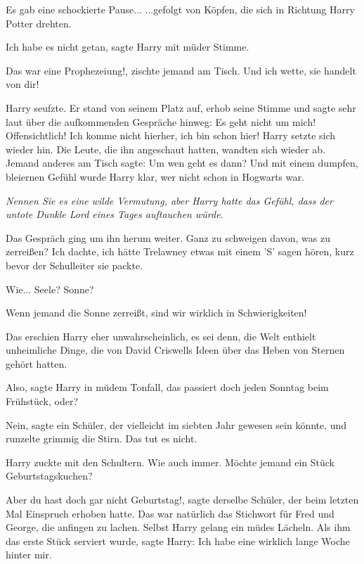 Es gab eine schockierte Pause... ...gefolgt von Köpfen, die sich in Richtung
Harry Potter drehten.

\glqq Ich habe es nicht getan\grqq{}, sagte Harry mit müder Stimme.

\glqq Das war eine Prophezeiung!\grqq{}, zischte jemand am Tisch. \glqq Und ich
wette, sie handelt von dir!\grqq{}

Harry seufzte. Er stand von seinem Platz auf, erhob seine Stimme und sagte sehr
laut über die aufkommenden Gespräche hinweg: \glqq Es geht nicht um mich!
Offensichtlich! Ich komme nicht hierher, ich bin schon hier!\grqq{} Harry setzte
sich wieder hin. Die Leute, die ihn angeschaut hatten, wandten sich wieder ab.
Jemand anderes am Tisch sagte: \glqq Um wen geht es dann?\grqq{} Und mit einem
dumpfen, bleiernen Gefühl wurde Harry klar, wer nicht schon in Hogwarts war.

\emph{Nennen Sie es eine wilde Vermutung, aber Harry hatte das Gefühl, dass der
untote Dunkle Lord eines Tages auftauchen würde.}

Das Gespräch ging um ihn herum weiter. \glqq Ganz zu schweigen davon, was zu
zerreißen?\grqq{} \glqq Ich dachte, ich hätte Trelawney etwas mit einem 'S'
sagen hören, kurz bevor der Schulleiter sie packte.\grqq{}

\glqq Wie... Seele? Sonne?\grqq{}

\glqq Wenn jemand die Sonne zerreißt, sind wir wirklich in
Schwierigkeiten!\grqq{}

Das erschien Harry eher unwahrscheinlich, es sei denn, die Welt enthielt
unheimliche Dinge, die von David Criswells Ideen über das Heben von Sternen
gehört hatten.

\glqq Also\grqq{}, sagte Harry in müdem Tonfall, \glqq das passiert doch jeden
Sonntag beim Frühstück, oder?\grqq{}

\glqq Nein\grqq{}, sagte ein Schüler, der vielleicht im siebten Jahr gewesen
sein könnte, und runzelte grimmig die Stirn. \glqq Das tut es nicht.\grqq{}

Harry zuckte mit den Schultern. \glqq Wie auch immer. Möchte jemand ein Stück
Geburtstagskuchen?\grqq{}

\glqq Aber du hast doch gar nicht Geburtstag!\grqq{}, sagte derselbe Schüler,
der beim letzten Mal Einspruch erhoben hatte. Das war natürlich das Stichwort
für Fred und George, die anfingen zu lachen. Selbst Harry gelang ein müdes
Lächeln. Als ihm das erste Stück serviert wurde, sagte Harry: \glqq Ich habe
eine wirklich lange Woche hinter mir.\grqq{}


